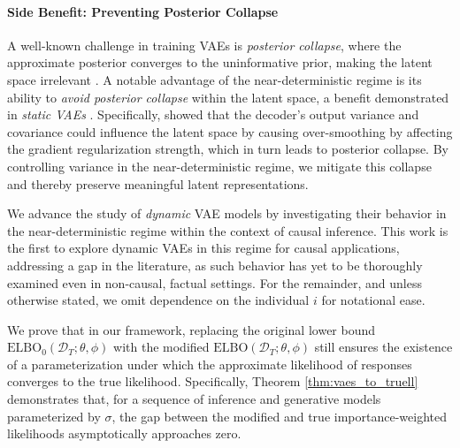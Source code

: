 \documentclass[10pt]{article} %
\begin{document}
\paragraph{Side Benefit: Preventing Posterior Collapse} A well-known challenge in training VAEs is \emph{posterior collapse}, where the approximate posterior converges to the uninformative prior, making the latent space irrelevant \citep{bowman2015generating, sonderby2016ladder, higgins2017betavae, dai2018diagnosingvae, fu2019cyclical, lucas2019dontblameElbo, wang2021PosteriorNonIdentif, takida2022preventingoversmoothing}. A notable advantage of the near-deterministic regime is its ability to \emph{avoid posterior collapse} within the latent space, a benefit demonstrated in \emph{static VAEs} \citep{lucas2019dontblameElbo, takida2022preventingoversmoothing}. Specifically, \cite{takida2022preventingoversmoothing} showed that the decoder’s output variance and covariance could influence the latent space by causing over-smoothing by affecting the gradient regularization strength, which in turn leads to posterior collapse. By controlling variance in the near-deterministic regime, we mitigate this collapse and thereby preserve meaningful latent representations.


We advance the study of \emph{dynamic} VAE models by investigating their behavior in the near-deterministic regime within the context of causal inference. This work is the first to explore dynamic VAEs in this regime for causal applications, addressing a gap in the literature, as such behavior has yet to be thoroughly examined even in non-causal, factual settings. For the remainder, and unless otherwise stated, we omit dependence on the individual $i$ for notational ease.

We prove that in our framework, replacing the original lower bound $\mathrm{ELBO_0}(\mathcal{D}_T; \theta, \phi)$ with the modified $\mathrm{ELBO}(\mathcal{D}_T; \theta, \phi)$ still ensures the existence of a parameterization under which the approximate likelihood of responses converges to the true likelihood. Specifically, Theorem \ref{thm:vaes_to_truell} demonstrates that, for a sequence of inference and generative models parameterized by \(\sigma\), the gap between the modified and true importance-weighted likelihoods asymptotically approaches zero.  
\end{document}
